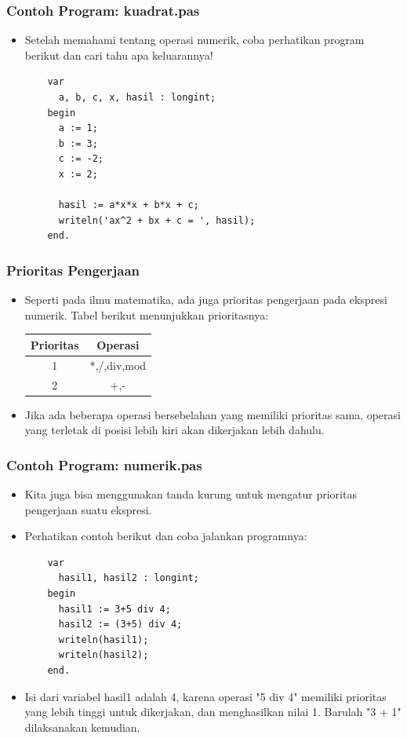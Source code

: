 \documentclass{beamer}
\begin{document}
\begin{frame}[fragile]
\frametitle{Contoh Program: kuadrat.pas}
\begin{itemize}
  \item Setelah memahami tentang operasi numerik, coba perhatikan program berikut dan cari tahu apa keluarannya!
  \begin{lstlisting}
    var
      a, b, c, x, hasil : longint;
    begin
      a := 1;
      b := 3;
      c := -2;
      x := 2;

      hasil := a*x*x + b*x + c;
      writeln('ax^2 + bx + c = ', hasil);
    end.
  \end{lstlisting}
\end{itemize}
\end{frame}

\begin{frame}
\frametitle{Prioritas Pengerjaan}
\begin{itemize}
  \item Seperti pada ilmu matematika, ada juga prioritas pengerjaan pada ekspresi numerik. Tabel berikut menunjukkan prioritasnya:

  \begin{tabular}{|c|c|}
  \hline Prioritas & Operasi \\
  \hline 1 & *,/,div,mod \\
  \hline 2 & +,- \\
  \hline
  \end{tabular}
  \item Jika ada beberapa operasi bersebelahan yang memiliki prioritas sama, operasi yang terletak di posisi lebih kiri akan dikerjakan lebih dahulu.
\end{itemize}
\end{frame}

\begin{frame}[fragile]
\frametitle{Contoh Program: numerik.pas}
\begin{itemize}
  \item Kita juga bisa menggunakan tanda kurung untuk mengatur prioritas pengerjaan suatu ekspresi.
  \item Perhatikan contoh berikut dan coba jalankan programnya:
  \begin{lstlisting}
    var
      hasil1, hasil2 : longint;
    begin
      hasil1 := 3+5 div 4;
      hasil2 := (3+5) div 4;
      writeln(hasil1);
      writeln(hasil2);
    end.
  \end{lstlisting}
  \item Isi dari variabel hasil1 adalah 4, karena operasi "5 div 4" memiliki prioritas yang lebih tinggi untuk dikerjakan, dan menghasilkan nilai 1. Barulah "3 + 1" dilaksanakan kemudian.
\end{itemize}
\end{frame}
\end{document}
